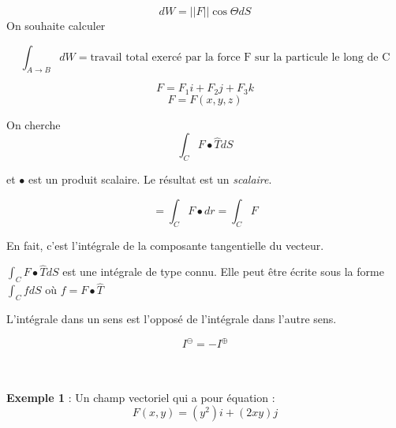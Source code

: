 \[dW = ||F|| \cos \Theta dS\]
On souhaite calculer

\[\int_{A\to B} dW = \text{travail total exercé par la force F sur la particule le long de C}\]


\[F=F_1 i + F_2 j +F_3 k\]
\[F = F(x,y,z)\]

On cherche
\[\int_CF\bullet \hat T dS\]

et $\bullet$ est un produit scalaire. Le résultat est un \emph{scalaire}.

\[= \int_C F\bullet dr = \int_C F\]

En fait, c'est l'intégrale de la composante tangentielle du vecteur.

$\int_CF\bullet \hat T dS$ est une intégrale de type connu. Elle peut être écrite sous la forme $\int_C f dS$ où $f=F \bullet \hat{T}$

L'intégrale dans un sens est l'opposé de l'intégrale dans l'autre sens.

\[I^{\ominus} = -I^{\oplus}\]



\\
\\
\textbf{Exemple 1} :
Un champ vectoriel qui a pour équation :
\[F(x,y)=(y^2)i+(2xy)j\]

